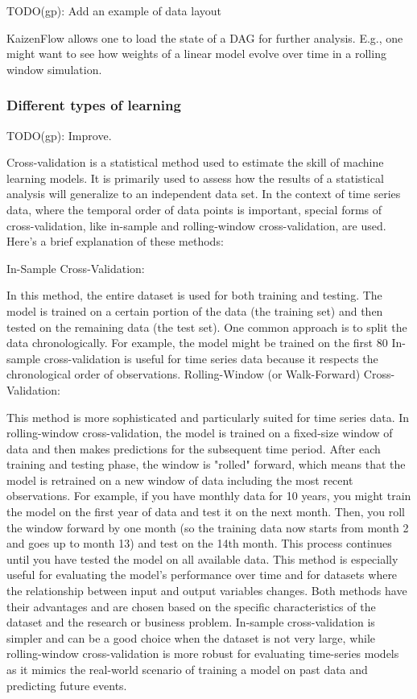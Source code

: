 \documentclass[11pt, reqno]{amsart}
\theoremstyle{definition}
\theoremstyle{remark}
\begin{document}
  TODO(gp): Add an example of data layout

  KaizenFlow allows one to load the state of a DAG for further analysis. E.g., one
  might want to see how weights of a linear model evolve over time in a rolling window
  simulation.

  \subsubsection{Different types of learning}

  TODO(gp): Improve.

  Cross-validation is a statistical method used to estimate the skill of machine
  learning models. It is primarily used to assess how the results of a statistical
  analysis will generalize to an independent data set. In the context of time
  series data, where the temporal order of data points is important, special
  forms of cross-validation, like in-sample and rolling-window cross-validation,
  are used. Here's a brief explanation of these methods:

  In-Sample Cross-Validation:

  In this method, the entire dataset is used for both training and testing. The model
  is trained on a certain portion of the data (the training set) and then tested
  on the remaining data (the test set). One common approach is to split the data
  chronologically. For example, the model might be trained on the first 80%
  In-sample cross-validation is useful for time series data because it respects the
  chronological order of observations. Rolling-Window (or Walk-Forward) Cross-Validation:

  This method is more sophisticated and particularly suited for time series data.
  In rolling-window cross-validation, the model is trained on a fixed-size
  window of data and then makes predictions for the subsequent time period. After
  each training and testing phase, the window is "rolled" forward, which means that
  the model is retrained on a new window of data including the most recent observations.
  For example, if you have monthly data for 10 years, you might train the model
  on the first year of data and test it on the next month. Then, you roll the
  window forward by one month (so the training data now starts from month 2 and goes
  up to month 13) and test on the 14th month. This process continues until you have
  tested the model on all available data. This method is especially useful for
  evaluating the model's performance over time and for datasets where the
  relationship between input and output variables changes. Both methods have their
  advantages and are chosen based on the specific characteristics of the dataset
  and the research or business problem. In-sample cross-validation is simpler
  and can be a good choice when the dataset is not very large, while rolling-window
  cross-validation is more robust for evaluating time-series models as it mimics
  the real-world scenario of training a model on past data and predicting future
  events.
\end{document}
